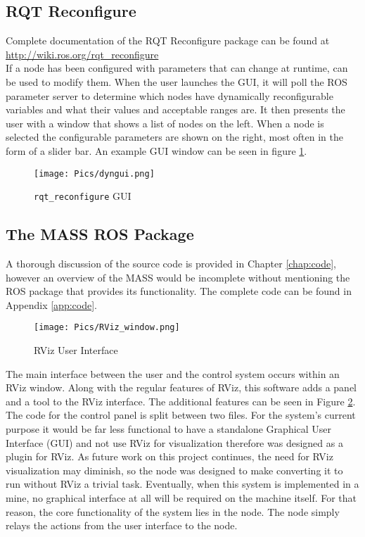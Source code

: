 \subsection{RQT Reconfigure}

Complete documentation of the RQT Reconfigure package can be found at \url{http://wiki.ros.org/rqt_reconfigure}\\

If a node has been configured with parameters that can change at runtime,  can be used to modify them. When the user launches the GUI, it will poll the ROS parameter server to determine which nodes have dynamically reconfigurable variables and what their values and acceptable ranges are. It then presents the user with a window that shows a list of nodes on the left. When a node is selected the configurable parameters are shown on the right, most often in the form of a slider bar. An example  GUI window can be seen in figure \ref{fig:dyngui2}.

\begin{figure}[h]
    \centering
    \texttt{[image: Pics/dyngui.png]}
    \caption{\texttt{rqt\_reconfigure} GUI}
    \label{fig:dyngui2}
\end{figure}

\subsection{The MASS ROS Package}
\label{sub:software}

A thorough discussion of the source code is provided in Chapter \ref{chap:code}, however an overview of the MASS would be incomplete without mentioning the ROS package that provides its functionality. The complete code can be found in Appendix \ref{app:code}.\\ 

\begin{figure}[H]
    \centering
    \texttt{[image: Pics/RViz\_window.png]}
    \caption{RViz User Interface}
    \label{fig:panel}
\end{figure}

The main interface between the user and the control system occurs within an RViz window. Along with the regular features of RViz, this software adds a panel and a tool to the RViz interface. The additional features can be seen in Figure \ref{fig:panel}. The code for the control panel is split between two files. For the system's current purpose it would be far less functional to have a standalone Graphical User Interface (GUI) and not use RViz for visualization therefore  was designed as a plugin for RViz. As future work on this project continues, the need for RViz visualization may diminish, so the node was designed to make converting it to run without RViz a trivial task. Eventually, when this system is implemented in a mine, no graphical interface at all will be required on the machine itself. For that reason, the core functionality of the system lies in the  node. The  node simply relays the actions from the user interface to the  node.\\

